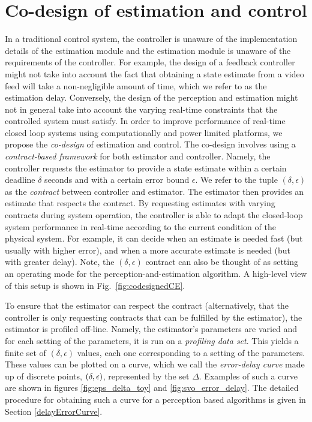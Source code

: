 \section{Co-design of estimation and control}
\label{sec:codesign}

In a traditional control system, %
the controller is unaware of the implementation details of the estimation module and the estimation module is unaware of the requirements of the controller.
For example, the design of a feedback controller might not take into account the fact that obtaining a state estimate from a video feed will take a non-negligible amount of time, which we refer to as the estimation delay.
Conversely, the design of the perception and estimation might not in general take into account the varying real-time constraints that the controlled system must satisfy. %
In order to improve performance of real-time closed loop systems using computationally and power limited platforms, we propose the \emph{co-design} of estimation and control.
The co-design involves using a \emph{contract-based framework} for both estimator and controller.
Namely, the controller requests the estimator to provide a state estimate within a certain deadline $\delta$ seconds and with a certain error bound $\epsilon$.
We refer to the tuple $(\delta,\epsilon)$ as the \emph{contract} between controller and estimator. 
The estimator then provides an estimate that respects the contract.
By requesting estimates with varying contracts during system operation, the controller is able to adapt the closed-loop system performance in real-time according to the current condition of the physical system.
For example, it can decide when an estimate is needed fast (but usually with higher error), and when a more accurate estimate is needed (but with greater delay). Note, the $(\delta,\epsilon)$ contract can also be thought of as setting an operating mode for the perception-and-estimation algorithm. A high-level view of this setup is shown in Fig.~\ref{fig:codesignedCE}.

To ensure that the estimator can respect the contract (alternatively, that the controller is only requesting contracts that can be fulfilled by the estimator), the estimator is profiled off-line.
Namely, the estimator's parameters are varied and for each setting of the parameters, it is run on a \emph{profiling data set}. 
This yields a finite set of $(\delta,\epsilon)$ values, each one corresponding to a setting of the parameters.
These values can be plotted on a curve, which we call the \emph{error-delay curve} made up of discrete points, $(\delta,\epsilon)$, represented by the set $\Delta$. Examples of such a curve are shown in figures \ref{fig:eps_delta_toy} and \ref{fig:svo_error_delay}.
The detailed procedure for obtaining such a curve for a perception based algorithms is given in Section \ref{delayErrorCurve}.


